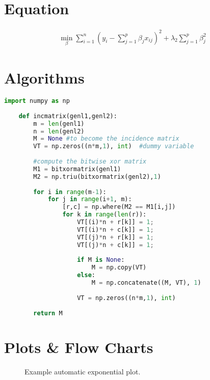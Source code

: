 \section{Equation}

\begin{equation} 
    \label{eq:referenceToEq1}
	\begin{gathered}
		\min_\beta \sum_{i=1}^n \left( y_i - \sum_{j=1}^p \beta_j x_{ij} \right)^2 + \lambda_2 \sum_{j=1}^p \beta_j^2
	\end{gathered}
\end{equation}



\section{Algorithms}

\begin{lstlisting}[language=Python, caption=Python example, label=alg:referenceToAlg]
    import numpy as np
        
    def incmatrix(genl1,genl2):
        m = len(genl1)
        n = len(genl2)
        M = None #to become the incidence matrix
        VT = np.zeros((n*m,1), int)  #dummy variable
        
        #compute the bitwise xor matrix
        M1 = bitxormatrix(genl1)
        M2 = np.triu(bitxormatrix(genl2),1) 
    
        for i in range(m-1):
            for j in range(i+1, m):
                [r,c] = np.where(M2 == M1[i,j])
                for k in range(len(r)):
                    VT[(i)*n + r[k]] = 1;
                    VT[(i)*n + c[k]] = 1;
                    VT[(j)*n + r[k]] = 1;
                    VT[(j)*n + c[k]] = 1;
                    
                    if M is None:
                        M = np.copy(VT)
                    else:
                        M = np.concatenate((M, VT), 1)
                    
                    VT = np.zeros((n*m,1), int)
        
        return M
\end{lstlisting}


\section{Plots \& Flow Charts}

\begin{figure}[H]
    \center
    \caption{Example automatic exponential plot.} 
    \label{fig:expPlot}
\end{figure}

